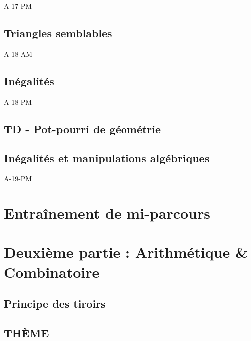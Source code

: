 \documentclass[poly,trombi]{valbonne}
\begin{document}
{A-17-PM}

\subsection{Triangles semblables}

{A-18-AM}

\subsection{Inégalités}

{A-18-PM}

\subsection{TD - Pot-pourri de géométrie}


\subsection{Inégalités et manipulations algébriques}

{A-19-PM}


\section{Entraînement de mi-parcours}



\section{Deuxième partie : Arithmétique \& Combinatoire}

\subsection{Principe des tiroirs}


\subsection{THÈME}

\end{document}
